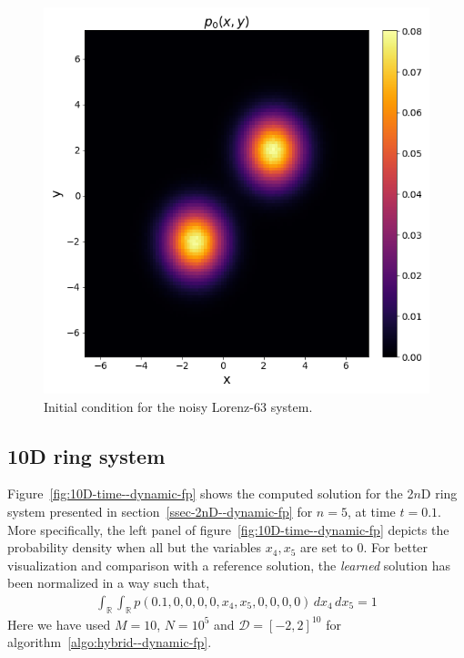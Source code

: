 \begin{figure}[!ht]
    \centering
\includegraphics[scale=0.41]{dynamic-fp/plots/dynamic-plots-L63-0.png}
    \caption{Initial condition for the noisy Lorenz-63 system.}
    \label{fig:L63-0--dynamic-fp}
\end{figure}

\subsection{10D ring system} Figure~\ref{fig:10D-time--dynamic-fp} shows the computed solution for the 2$n$D ring system presented in section~\ref{ssec-2nD--dynamic-fp} for $n=5$, at time $t=0.1$. More specifically, the left panel of figure~\ref{fig:10D-time--dynamic-fp} depicts the probability density when all but the variables $x_4, x_5$ are set to $0$. For better visualization and comparison with a reference solution, the \textit{learned} solution has been normalized in a way such that,
\begin{align*}
   \int_\mathbb{R}\int_\mathbb{R} p(0.1, 0, 0, 0, 0, x_4, x_5, 0, 0, 0, 0)\, dx_4\,dx_5=1 
\end{align*}
Here we have used $M=10$, $N=10^5$ and $\mathcal D=[-2,2]^{10}$ for algorithm~\ref{algo:hybrid--dynamic-fp}.

